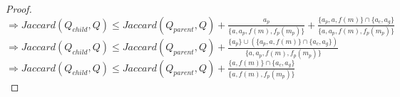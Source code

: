 \begin{proof}
$\Rightarrow Jaccard(Q_{child},Q)   \leq   Jaccard(Q_{parent}, Q) +  \frac{a_p }{\{  a,a_p, f(m),  f_p(m_p)  \} } + \frac{\{a_p,a,f(m) \} \cap \{ a_c,a_g \} }{\{  a,a_p, f(m),  f_p(m_p)  \} }  $\\

$\Rightarrow Jaccard(Q_{child},Q)   \leq   Jaccard(Q_{parent}, Q) +   \frac{ \{ a_p\} \cup  \left( \{a_p,a,f(m) \} \cap \{ a_c,a_g \} \right)}{\{  a,a_p, f(m),  f_p(m_p)  \} }  $\\

$\Rightarrow Jaccard(Q_{child},Q)   \leq   Jaccard(Q_{parent}, Q) +   \frac{   \{a,f(m) \} \cap \{ a_c,a_g \} }{\{  a, f(m),  f_p(m_p)  \} }  $\\

\end{proof}
